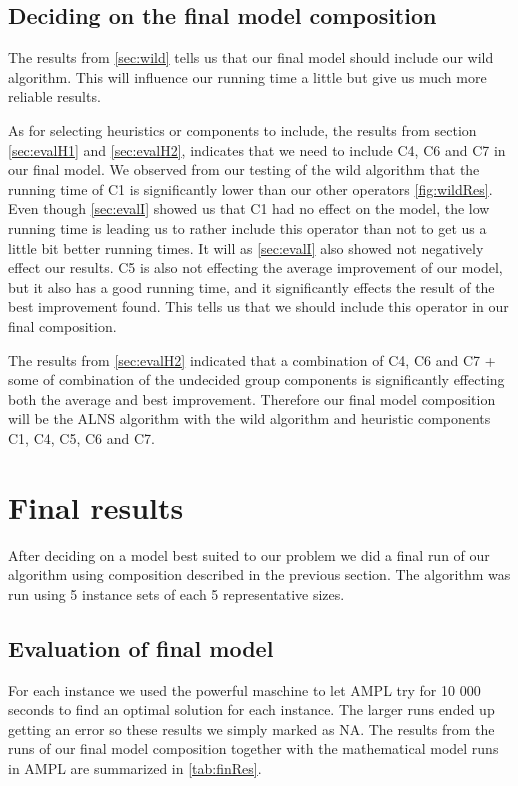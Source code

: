 \documentclass[../main.tex]{subfiles}
\begin{document}
\subsection{Deciding on the final model composition}
\label{sec:iniObs}
The results from \cref{sec:wild} tells us that our final model should include our wild algorithm. 
This will influence our running time a little but give us much more reliable results.
\par
As for selecting heuristics or components to include, the results from section \cref{sec:evalH1} and \cref{sec:evalH2}, indicates that we need to include C4, C6 and C7 in our final model.
We observed from our testing of the wild algorithm that the running time of C1 is significantly lower than our other operators \cref{fig:wildRes}. Even though \cref{sec:evalI} showed us that C1 had no effect on the model, the low running time is leading us to rather include this operator than not to get us a little bit better running times.
It will as \cref{sec:evalI} also showed not negatively effect our results.
C5 is also not effecting the average improvement of our model, but it also has a good running time, and it significantly effects the result of the best improvement found. This tells us that we should include this operator in our final composition. \par
The results from \cref{sec:evalH2} indicated that a combination of C4, C6 and C7 + some of combination of the undecided group components is significantly effecting both the average and best improvement. Therefore our final model composition will be the ALNS algorithm with the wild algorithm and heuristic components C1, C4, C5, C6 and C7.

\section{Final results}
\label{sec:finRes}
After deciding on a model best suited to our problem we did a final run of our algorithm using composition described in the previous section.
The algorithm was run using 5 instance sets of each 5 representative sizes. 
\subsection{Evaluation of final model}
\label{sec:finRes}
For each instance we used the powerful maschine to let AMPL try for 10 000 seconds to find an optimal solution for each instance. 
The larger runs ended up getting an error so these results we simply marked as NA.
The results from the runs of our final model composition together with the mathematical model runs in AMPL are summarized in \cref{tab:finRes}. 
\end{document}
